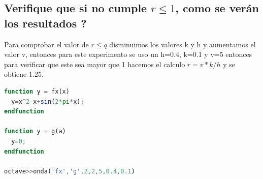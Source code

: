\documentclass{article}
\begin{document}
\subsection{Verifique que si no cumple $r \leq 1$, como se verán los resultados ?}
Para comprobar el valor de $r\leq q$ disminuimos los valores k y h y aumentamos el valor v, entonces para este experimento se uso un h=0.4, k=0.1 y v=5 entonces para verificar que este sea mayor que 1 hacemos el calculo $r = v*k/h$ y se obtiene 1.25.
\begin{lstlisting}[language=Octave, caption=Comando y código de funciones g(x) y f(x) ,label=lst:]
function y = fx(x)
  y=x^2-x+sin(2*pi*x);
endfunction

function y = g(a)
  y=0;
endfunction

octave>>onda('fx','g',2,2,5,0.4,0.1)
\end{lstlisting}
\end{document}
